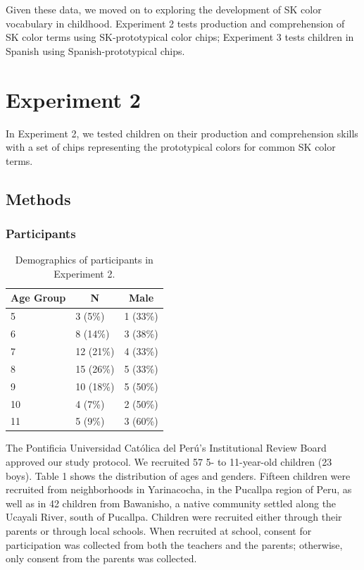 \documentclass[
  english,
  ,man,floatsintext]{apa6}
\begin{document}
Given these data, we moved on to exploring the development of SK color vocabulary in childhood. Experiment 2 tests production and comprehension of SK color terms using SK-prototypical color chips; Experiment 3 tests children in Spanish using Spanish-prototypical chips.

\hypertarget{experiment-2}{%
\section{Experiment 2}\label{experiment-2}}

In Experiment 2, we tested children on their production and comprehension skills with a set of chips representing the prototypical colors for common SK color terms.

\hypertarget{methods-1}{%
\subsection{Methods}\label{methods-1}}

\hypertarget{participants-1}{%
\subsubsection{Participants}\label{participants-1}}

\begin{table}[tbp]
\begin{center}
\begin{threeparttable}
\caption{\label{tab:unnamed-chunk-2}Demographics of participants in Experiment 2.}
\begin{tabular}{lll}
\toprule
Age Group & \multicolumn{1}{c}{N} & \multicolumn{1}{c}{Male}\\
\midrule
5 & 3 (5\%) & 1 (33\%)\\
6 & 8 (14\%) & 3 (38\%)\\
7 & 12 (21\%) & 4 (33\%)\\
8 & 15 (26\%) & 5 (33\%)\\
9 & 10 (18\%) & 5 (50\%)\\
10 & 4 (7\%) & 2 (50\%)\\
11 & 5 (9\%) & 3 (60\%)\\
\bottomrule
\end{tabular}
\end{threeparttable}
\end{center}
\end{table}

The Pontificia Universidad Católica del Perú's Institutional Review Board approved our study protocol. We recruited 57 5- to 11-year-old children (23 boys). Table 1 shows the distribution of ages and genders. Fifteen children were recruited from neighborhoods in Yarinacocha, in the Pucallpa region of Peru, as well as in 42 children from Bawanisho, a native community settled along the Ucayali River, south of Pucallpa. Children were recruited either through their parents or through local schools. When recruited at school, consent for participation was collected from both the teachers and the parents; otherwise, only consent from the parents was collected.
\end{document}

